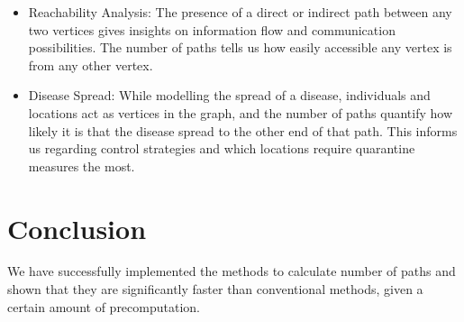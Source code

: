 \documentclass[12pt, a4paper]{article}
\begin{document}
\begin{flushleft}
\begin{itemize}
        \item Reachability Analysis: The presence of a direct or indirect path between any two vertices gives insights on information flow and communication possibilities. The number of paths tells us how easily accessible any vertex is from any other vertex.

        \item Disease Spread: While modelling the spread of a disease, individuals and locations act as vertices in the graph, and the number of paths quantify how likely it is that the disease spread to the other end of that path. This informs us regarding control strategies and which locations require quarantine measures the most.
      \end{itemize}

    \end{flushleft} 

    \section{Conclusion}
    \begin{flushleft}
      We have successfully implemented the methods to calculate number of paths and shown that they are significantly faster than conventional methods, given a certain amount of precomputation.
    \end{flushleft}
\end{document}
